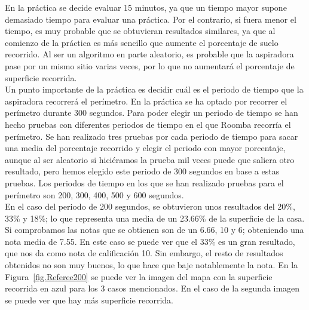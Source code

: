 En la práctica se decide evaluar 15 minutos, ya que un tiempo mayor supone demasiado tiempo para evaluar una práctica. Por el contrario, si fuera menor el tiempo, es muy probable que se obtuvieran resultados similares, ya que al comienzo de la práctica es más sencillo que aumente el porcentaje de suelo recorrido. Al ser un algoritmo en parte aleatorio, es probable que la aspiradora pase por un mismo sitio varias veces, por lo que no aumentará el porcentaje de superficie recorrida.\\

Un punto importante de la práctica es decidir cuál es el periodo de tiempo que la aspiradora recorrerá el perímetro. En la práctica se ha optado por recorrer el perímetro durante 300 segundos. Para poder elegir un periodo de tiempo se han hecho pruebas con diferentes periodos de tiempo en el que Roomba recorría el perímetro. Se han realizado tres pruebas por cada periodo de tiempo para sacar una media del porcentaje recorrido y elegir el periodo con mayor porcentaje, aunque al ser aleatorio si hiciéramos la prueba mil veces puede que saliera otro resultado, pero hemos elegido este periodo de 300 segundos en base a estas pruebas. Los periodos de tiempo en los que se han realizado pruebas para el perímetro son 200, 300, 400, 500 y 600 segundos.\\

En el caso del periodo de 200 segundos, se obtuvieron unos resultados del 20\%, 33\% y 18\%; lo que representa una media de un 23.66\% de la superficie de la casa. Si comprobamos las notas que se obtienen son de un 6.66, 10 y 6; obteniendo una nota media de 7.55. En este caso se puede ver que el 33\% es un gran resultado, que nos da como nota de calificación 10. Sin embargo, el resto de resultados obtenidos no son muy buenos, lo que hace que baje notablemente la nota. En la Figura~\ref{fig.Referee200} se puede ver la imagen del mapa con la superficie recorrida en azul para los 3 casos mencionados. En el caso de la segunda imagen se puede ver que hay más superficie recorrida.


